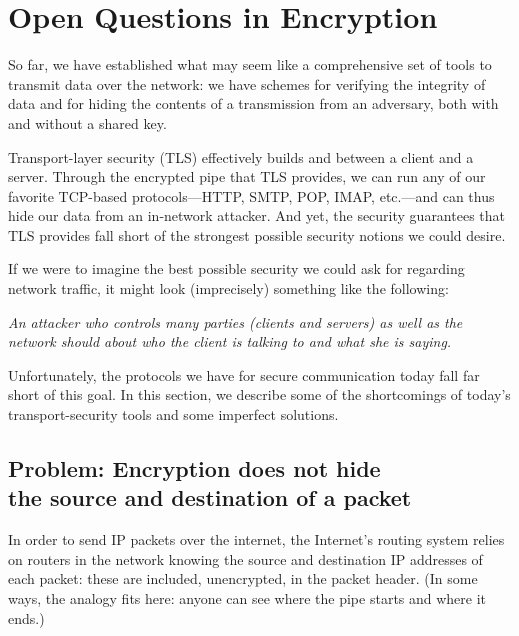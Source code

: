 \chapter{Open Questions in Encryption}

So far, we have established what may seem like
a comprehensive set of tools to transmit data over
the network: we have schemes for verifying the
integrity of data and for hiding the contents of
a transmission from an adversary, both with and
without a shared key.

Transport-layer security (TLS) effectively builds
and  between a client and a server.
Through the encrypted pipe that TLS provides, we can run 
any of our favorite TCP-based
protocols---HTTP, SMTP, POP, IMAP, etc.---and can
thus hide our data from an in-network attacker.
And yet, the security guarantees that TLS provides fall
short of the strongest possible security notions we could
desire.

If we were to imagine the best possible security
we could ask for regarding network traffic, it
might look (imprecisely) something like the
following:

\begin{framed}\noindent
\emph{An attacker who controls many parties (clients and servers) as well as the network should  about who the client is talking to and what she is saying.}
\end{framed}

Unfortunately, the protocols we have for secure communication today
fall far short of this goal.
In this section, we describe some of the shortcomings of today's
transport-security tools and some imperfect solutions.

\section{Problem: Encryption does not hide\\the source and destination of a packet}

\iffalse
In order to even begin talking to
a server, the client must learn the server's IP
address. This happens using the DNS protocol,
which is entirely unencrypted---a network
adversary can easily watch the DNS queries a client
makes and learn who it is talking to.
\fi

In order to send IP packets over the
internet, the Internet's routing system relies
on routers in the network knowing the source
and destination IP addresses of each packet: these are
included, unencrypted, in the packet header. 
(In some ways, the  analogy fits
here: anyone can see where the pipe starts and
where it ends.)

